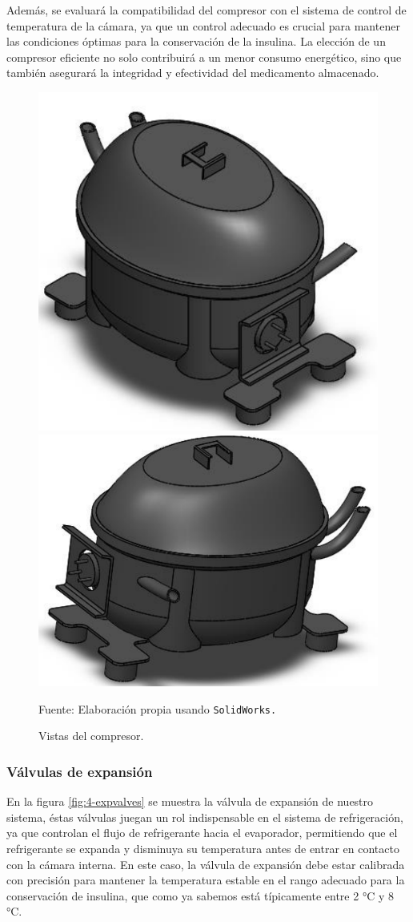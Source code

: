  Además, se evaluará la compatibilidad del compresor con el sistema de control de temperatura de la cámara, ya que un control adecuado es crucial para mantener las condiciones óptimas para la conservación de la insulina. La elección de un compresor eficiente no solo contribuirá a un menor consumo energético, sino que también asegurará la integridad y efectividad del medicamento almacenado.
 
 \begin{figure}[H] 
 	\centering 
 	\includegraphics[width=0.4\linewidth]{figures/4-compressor}\includegraphics[width=0.4\linewidth]{figures/4-compressor2}
 	\caption{Vistas del compresor.} 
 	Fuente: Elaboración propia usando \texttt{SolidWorks.} 
 	\label{fig:4-compressor}
 \end{figure}
 
\subsubsection{Válvulas de expansión}
En la figura \ref{fig:4-expvalves} se muestra la válvula de expansión de nuestro sistema, éstas válvulas juegan un rol indispensable en el sistema de refrigeración, ya que controlan el flujo de refrigerante hacia el evaporador, permitiendo que el refrigerante se expanda y disminuya su temperatura antes de entrar en contacto con la cámara interna. En este caso, la válvula de expansión debe estar calibrada con precisión para mantener la temperatura estable en el rango adecuado para la conservación de insulina, que como ya sabemos está típicamente entre 2 °C y 8 °C.

